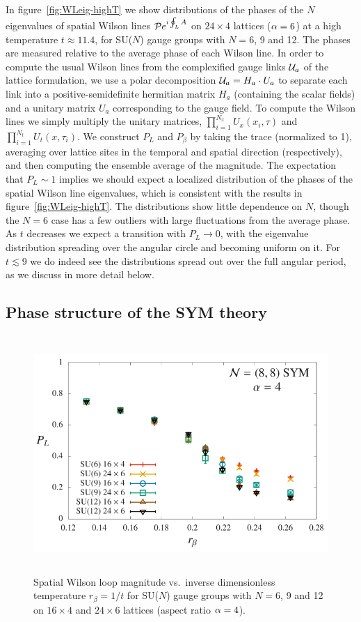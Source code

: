 In figure~\ref{fig:WLeig-highT} we show distributions of the phases of the $N$ eigenvalues of spatial Wilson lines $\mathcal P e^{i\oint_L A}$ on $24\times 4$ lattices ($\alpha = 6$) at a high temperature $t \approx 11.4$, for SU($N$) gauge groups with $N = 6$, 9 and 12.
The phases are measured relative to the average phase of each Wilson line.
In order to compute the usual Wilson lines from the complexified gauge links $\mathcal U_a$ of the lattice formulation, we use a polar decomposition $\mathcal U_a = H_a \cdot U_a$ to separate each link into a positive-semidefinite hermitian matrix $H_a$ (containing the scalar fields) and a unitary matrix $U_a$ corresponding to the gauge field.
To compute the Wilson lines we simply multiply the unitary matrices, $\prod_{i = 1}^{N_x} U_x(x_i, \tau)$ and $\prod_{i = 1}^{N_t} U_t(x, \tau_i)$.
We construct $P_L$ and $P_{\beta}$ by taking the trace (normalized to 1), averaging over lattice sites in the temporal and spatial direction (respectively), and then computing the ensemble average of the magnitude.
The expectation that $P_L \sim 1$ implies we should expect a localized distribution of the phases of the spatial Wilson line eigenvalues, which is consistent with the results in figure~\ref{fig:WLeig-highT}.
The distributions show little dependence on $N$, though the $N = 6$ case has a few outliers with large fluctuations from the average phase.
As $t$ decreases we expect a transition with $P_L \to 0$, with the eigenvalue distribution spreading over the angular circle and becoming uniform on it.
For $t \lesssim 9$ we do indeed see the distributions spread out over the full angular period, as we discuss in more detail below. 

\subsection{Phase structure of the SYM theory}
\begin{figure}[tbp]
  \centering
  \includegraphics[height=9cm]{Figures/lines_alpha4.pdf}
  \caption{\label{fig:lines_alpha4}Spatial Wilson loop magnitude vs.~inverse dimensionless temperature $r_{\beta} = 1 / t$ for SU($N$) gauge groups with $N = 6$, 9 and 12 on $16\times 4$ and $24\times 6$ lattices (aspect ratio $\alpha = 4$).}
\end{figure}


